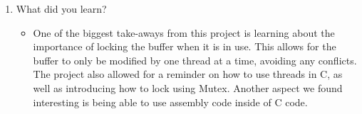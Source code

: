 \documentclass[letterpaper,10pt,onecolumn]{IEEEtran}
\begin{document}
\begin{enumerate}
\begin{itemize}
        \end{itemize}
        \item What did you learn?
        \begin{itemize}
            \item One of the biggest take-aways from this project is learning about the importance of locking the buffer when it is in use. This allows for the buffer to only be modified by one thread at a time, avoiding any conflicts. The project also allowed for a reminder on how to use threads in C, as well as introducing how to lock using Mutex. Another aspect we found interesting is being able to use assembly code inside of C code.
        \end{itemize}
    \end{enumerate}
    
    
\end{document}
